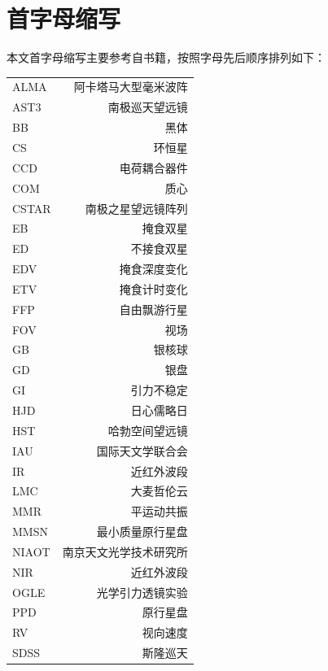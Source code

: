 \section{首字母缩写}  \label{apdx:acronym}
本文首字母缩写主要参考自书籍，按照字母先后顺序排列如下：
\begin{multicols}{2}
\begin{tabularx}{0.85\linewidth}{@{\extracolsep{\fill}}lr}
\centering
ALMA           &   阿卡塔马大型毫米波阵     	  \\ 
AST3           &   南极巡天望远镜     	   	  \\  
BB		   &   黑体					   \\
CS 	 	   &   环恒星				   \\
CCD		   &   电荷耦合器件			   \\
COM		   &   质心					   \\
CSTAR        &   南极之星望远镜阵列 		   \\  
EB               &   掩食双星 				   \\ 
ED               &   不接食双星 		 	   \\ 
EDV             &   掩食深度变化             	   \\
ETV             &   掩食计时变化             	   \\
FFP             &   自由飘游行星        		   \\ 
FOV            &   视场			     		   \\ 
GB              &   银核球				   \\
GD              &   银盘				  	    \\
GI                &   引力不稳定              		    \\
HJD            &    日心儒略日 	           	    \\
HST            &    哈勃空间望远镜            	    \\
IAU             &    国际天文学联合会   	    	    \\
IR               &   近红外波段		 	            \\
LMC            &   大麦哲伦云		 	    \\
MMR           &   平运动共振   	                     \\   
MMSN         &   最小质量原行星盘                 \\
NIAOT         &   南京天文光学技术研究所       \\
NIR              &   近红外波段		             \\
OGLE         &    光学引力透镜实验   	     	     \\
PPD            &    原行星盘   	   	     	     \\
RV              &    视向速度                    	     \\
SDSS         &    斯隆巡天                   	     	     \\


\end{tabularx}
\end{multicols}
